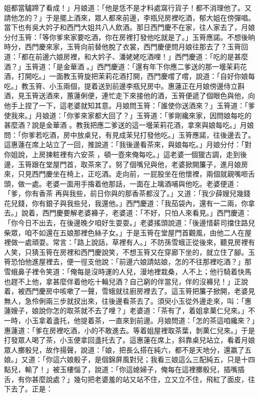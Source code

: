 \begin{showcontents}{}
姐都當驢蹄了看成！」月娘道：「他是恁不是才料處窩行貨子！都不消理他了。又請他怎的？」于是擺上酒來，眾人都來前邊，李瓶兒房裡吃酒，郁大姐在傍彈唱。當下也有吳大妗子和西門大姐共八人飲酒。那日西門慶不在家，往人家去了，月娘分付玉筲：「等你爹來家要吃酒，你在房裡打發他吃就是了。」玉筲應諾。不想後晌時分，西門慶來家，玉筲向前替他脫了衣裳，西門慶便問月娘往那去了？玉筲回道：「都在前邊六娘房裡，和大妗子、潘姥姥吃酒哩！」西門慶道：「吃的是甚麼酒？」玉筲道：「是金華酒 。」西門慶道：「還有年下你應二爹送的那一壜茉莉花酒，打開吃。」一面教玉筲旋把茉莉花酒打開，西門慶嚐了嚐，說道：「自好你娘每吃。」教玉筲、小玉兩個，提着送到前邊李瓶兒房中。惠蓮正在月娘傍邊侍立斟酒，見玉筲送酒來，蕙蓮俐便，連忙走下來接他的酒，玉筲便遞了個眼色與他，向他手上捏了一下，這老婆就知其意。月娘問玉筲：「誰使你送酒來？」玉筲道：「爹使我來。」月娘道：「你爹來家都大回了？」玉筲道：「爹剛纔來家，因問娘每吃的甚麼酒？說是金華酒 。教我把應二爹送的這一壜茉莉花酒，拿來與娘每吃。」月娘問：「你爹若吃酒，房中放桌兒，有見成茉兒打發他吃。」玉筲應諾，往後邊去了。這惠蓮在席上站立了一回，推說道：「我後邊看茶來，與娘每吃。」月娘分付：「對你姐說，上房揀粧裡有六安茶 ，頓一壺來俺每吃。」這老婆一個獵古調，走到後邊，玉筲跟在堂屋門首，取茶來了。努了個嘴兒與他，老婆掀開簾子，進月娘房來，只見西門慶坐在椅上，正吃酒。走向前，一屁股坐在他懷裡，兩個就親嘴咂舌頭，做一處。老婆一面用手揝着他那話，一面在上噙酒哺與他吃。老婆便道：「爹，你有香茶 再與我些，前日你與的那香茶都沒了。」又道：「我少薛嫂兒幾錢花兒錢，你有銀子與我些兒，我還他。」西門慶道：「我茄袋內，還有一二兩，你拿去。」說着，西門慶要解老婆褲子，老婆道：「不好，只怕人來看見。」西門慶道：「你今日不出去，在後邊晚夕咱好生耍耍。」老婆搖頭說道：「後邊惜薪司擋住路兒柴眾，咱不如還在五娘那裡色絲子女。」于是玉筲在堂屋門首觀風，由他二人在屋裡做一處頑耍。常言：「路上說話，草裡有人。」不防孫雪蛾正從後來，聽見房裡有人笑，只猜玉筲在房裡和西門慶說笑，不想玉筲又在穿廊下坐的，就立住了腳。玉筲恐怕他進屋裡去，便一徑支他說：「前邊六娘請姑娘，怎的不往那裡吃酒？」那雪蛾鼻子裡令笑道：「俺每是沒時運的人兒，漫地裡栽桑，人不上；他行騎着快馬也趕不上他，拿甚麼伴着他吃十輪兒酒？自己窮的伴當兒，伴的沒褲兒！」正說着，被西門慶房中咳嗽了一聲，雪蛾就往廚房裡去了。這玉筲把簾子掀開，老婆見無人，急伶俐兩三步就扠出來，往後邊看茶去了。須臾小玉從外邊走來，叫：「惠蓮嫂子，娘說你怎的取茶就不去了哩？」老婆道：「茶有了，着姐拿菓仁兒來。」不一時，小玉拿着盞托，他提着茶，一直來到前邊。月娘問道：「怎的茶這咱纔來？」惠蓮道：「爹在房裡吃酒，小的不敢進去。等着姐屋裡取茶葉，剝菓仁兒來。」于是打發眾人喝了茶，小玉便拿回盞托去了。這惠蓮在席上，斜靠桌兒站立，看着月娘眾人擲骰兒，故作揚聲，說道：「娘，把長么搭在純六，都不是天地分，還嬴了五娘。」又道：「你這六娘骰子，是個錦屏風對兒；我看三娘這么三配純五，只是十四點兒，輸了！」被玉樓惱了，說道：「你這媳婦子，俺每在這裡擲骰兒，插嘴插舌，有你甚麼說處？」幾句把老婆羞的站又站不住，立又立不住，飛紅了面皮，往下去了。正是：


\end{showcontents}
